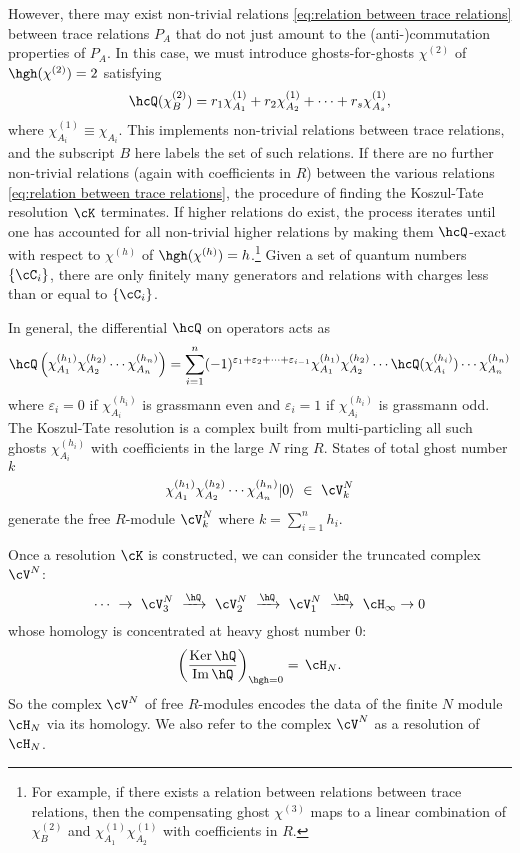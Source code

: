 \documentclass[a4paper,12pt]{article}
\begin{document}
However, there may exist non-trivial relations \eqref{eq:relation between trace relations} between trace relations $P_A$ that do not just amount to the (anti-)commutation properties of $P_A$. In this case, we must introduce ghosts-for-ghosts $\chi^{(2)}$ of $\hgh(\chi^{(2)}) = 2$ satisfying
\begin{equation}
\hcQ ( \chi^{(2)}_{B} ) = r_1 \chi_{A_1}^{(1)} + r_2 \chi_{A_2}^{(1)} + \cdots + r_s \chi_{A_s}^{(1)},
\end{equation}
where $\chi^{(1)}_{A_i} \equiv \chi_{A_i}$. This implements non-trivial relations between trace relations, and the subscript $B$ here labels the set of such relations. If there are no further non-trivial relations (again with coefficients in $R$) between the various relations \eqref{eq:relation between trace relations}, the procedure of finding the Koszul-Tate resolution $\cK$ terminates. If higher relations do exist, the process iterates until one has accounted for all non-trivial higher relations by making them $\hcQ$-exact with respect to $\chi^{(h)}$ of $\hgh(\chi^{(h)}) = h$.\footnote{For example, if there exists a relation between relations between trace relations, then the compensating ghost $\chi^{(3)}$ maps to a linear combination of $\chi_{B}^{(2)}$ and $\chi_{A_1}^{(1)}\chi_{A_2}^{(1)}$ with coefficients in $R$.} Given a set of quantum numbers $\{ \cC_i \}$, there are only finitely many generators and relations with charges less than or equal to $\{ \cC_i \}$.

In general, the differential $\hcQ$ on operators acts as
\begin{equation}
\hcQ \left( \chi^{(h_1)}_{A_1} \chi^{(h_2)}_{A_2} \cdots \chi^{(h_n)}_{A_n} \right) = \sum_{i=1}^n (-1)^{\varepsilon_1+ \varepsilon_2 + \cdots + \varepsilon_{i-1}} \chi^{(h_1)}_{A_1} \chi^{(h_2)}_{A_2} \cdots \hcQ(\chi^{(h_i)}_{A_i}) \cdots \chi^{(h_n)}_{A_n}
\end{equation}
where $\varepsilon_i=0$ if $\chi_{A_i}^{(h_i)}$ is grassmann even and $\varepsilon_i=1$ if $\chi_{A_i}^{(h_i)}$ is grassmann odd. The Koszul-Tate resolution is a complex built from multi-particling all such ghosts $\chi_{A_i}^{(h_i)}$ with coefficients in the large $N$ ring $R$. States of total ghost number $k$
\begin{equation}
\chi^{(h_1)}_{A_1} \chi^{(h_2)}_{A_2} \cdots \chi^{(h_n)}_{A_n} |0\rangle \ \in \ \cV_k^N
\end{equation}
generate the free $R$-module $\cV_k^N$ where $k = \sum_{i=1}^n h_i$.

Once a resolution $\cK$ is constructed, we can consider the truncated complex $\cV^N$:
\begin{equation}
\cdots \ \rightarrow \ \cV_3^{N} \ \xrightarrow{\hQ} \ \cV_2^{N} \ \xrightarrow{\hQ} \ \cV_1^{N} \ \xrightarrow{\hQ} \ \cH_\infty \rightarrow 0
\end{equation}
whose homology is concentrated at heavy ghost number $0$:
\begin{equation}
\left( \frac{\mathrm{Ker}\, \hQ}{\mathrm{Im}\, \hQ} \right)_{\hgh=0} = \, \cH_N.
\end{equation}
So the complex $\cV^N$ of free $R$-modules encodes the data of the finite $N$ module $\cH_N$ via its homology. We also refer to the complex $\cV^N$ as a resolution of $\cH_N$.
\end{document}
